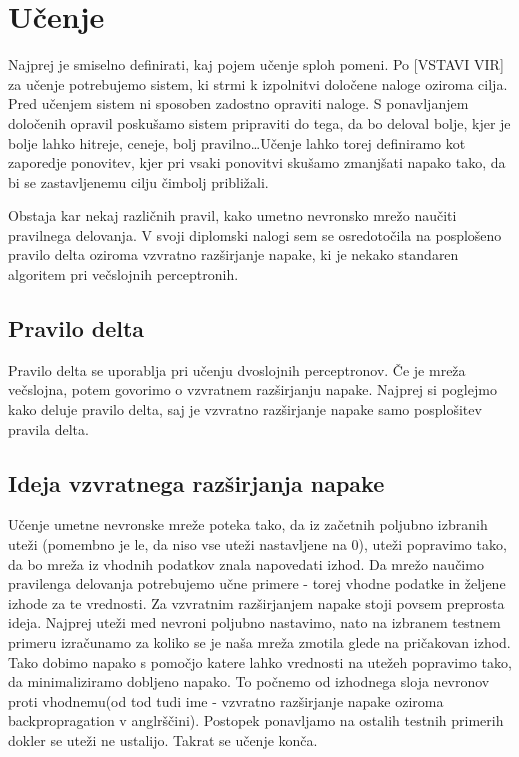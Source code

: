 \documentclass[mat1]{fmfdelo}
\begin{document}
\section{Učenje}
Najprej je smiselno definirati, kaj pojem učenje sploh pomeni. Po [VSTAVI VIR] za učenje potrebujemo sistem, ki strmi k izpolnitvi določene naloge oziroma cilja. Pred učenjem sistem ni sposoben zadostno opraviti naloge. S ponavljanjem določenih opravil poskušamo sistem pripraviti do tega, da bo deloval bolje, kjer je bolje lahko hitreje, ceneje, bolj pravilno\ldots Učenje lahko torej definiramo kot zaporedje ponovitev, kjer pri vsaki ponovitvi skušamo zmanjšati napako tako, da bi se zastavljenemu cilju čimbolj približali. 

Obstaja kar nekaj različnih pravil, kako umetno nevronsko mrežo naučiti pravilnega delovanja. V svoji diplomski nalogi sem se osredotočila na posplošeno pravilo delta oziroma vzvratno razširjanje napake, ki je nekako standaren algoritem pri večslojnih perceptronih. 

\subsection{Pravilo delta}
Pravilo delta se uporablja pri učenju dvoslojnih perceptronov. Če je mreža večslojna, potem govorimo o vzvratnem razširjanju napake. Najprej si poglejmo kako deluje pravilo delta, saj je vzvratno razširjanje napake samo posplošitev pravila delta.

\subsection{Ideja vzvratnega razširjanja napake}
Učenje umetne nevronske mreže poteka tako, da iz začetnih poljubno izbranih uteži (pomembno je le, da niso vse uteži nastavljene na 0), uteži popravimo tako, da bo mreža iz vhodnih podatkov znala napovedati izhod. Da mrežo naučimo pravilenga delovanja potrebujemo učne primere - torej vhodne podatke in željene izhode za te vrednosti. 
Za vzvratnim razširjanjem napake stoji povsem preprosta ideja. Najprej uteži med nevroni poljubno nastavimo, nato na izbranem testnem primeru izračunamo za koliko se je naša mreža zmotila glede na pričakovan izhod. Tako dobimo napako s pomočjo katere lahko  vrednosti na utežeh popravimo tako, da minimaliziramo dobljeno napako. To počnemo od izhodnega sloja nevronov proti vhodnemu(od tod tudi ime -  vzvratno razširjanje napake oziroma backpropragation v anglrščini). Postopek ponavljamo na ostalih testnih primerih dokler se uteži ne ustalijo. Takrat se učenje konča.
\end{document}
